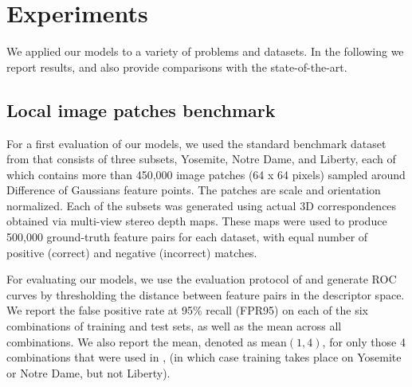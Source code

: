 \documentclass[10pt,twocolumn,letterpaper]{article}
\begin{document}
\section{Experiments}

We applied our models to a variety of problems and datasets. In the following we report results, and also provide comparisons with the state-of-the-art.

\subsection{Local image patches benchmark}
For a first evaluation of our models, we used the standard benchmark dataset from \cite{BHW10} that consists of three subsets, Yosemite, Notre Dame, and Liberty, each of 
which contains more than 450,000 image patches (64 x 64 pixels) sampled around 
Difference of Gaussians feature points. The patches are  scale and  orientation normalized. 
Each of the subsets was generated using actual 3D correspondences obtained via multi-view stereo depth maps. 
These maps were used to produce 500,000 ground-truth feature 
pairs for each dataset, with equal number of positive (correct) and negative (incorrect) matches.

For evaluating  our models, we use the evaluation
protocol of \cite{Brown11} and generate ROC curves by thresholding the distance between 
feature pairs in the descriptor space. We report the false positive rate at 
95\% recall (FPR95) on each of the six combinations of training and test sets, 
as well as the mean across all combinations. We also report the mean, denoted as $\mathrm{mean}(1,4)$, for only those 4 combinations that were used in \cite{Boix13CVPR}, \cite{BHW10}  (in which case training takes place on Yosemite or Notre Dame, but not 
Liberty).
\end{document}
